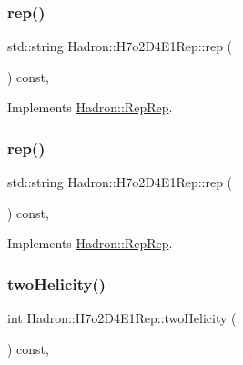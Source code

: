 \subsubsection{\texorpdfstring{rep()}{rep()}\hspace{0.1cm}{\footnotesize\ttfamily [4/5]}}
{\footnotesize\ttfamily std\+::string Hadron\+::\+H7o2\+D4\+E1\+Rep\+::rep (\begin{DoxyParamCaption}{ }\end{DoxyParamCaption}) const\hspace{0.3cm}{\ttfamily [inline]}, {\ttfamily [virtual]}}



Implements \mbox{\hyperlink{structHadron_1_1RepRep_ab3213025f6de249f7095892109575fde}{Hadron\+::\+Rep\+Rep}}.

\mbox{\label{structHadron_1_1H7o2D4E1Rep_ae6cc5dc38275bfce35b58694bc85cfe1}} 
\subsubsection{\texorpdfstring{rep()}{rep()}\hspace{0.1cm}{\footnotesize\ttfamily [5/5]}}
{\footnotesize\ttfamily std\+::string Hadron\+::\+H7o2\+D4\+E1\+Rep\+::rep (\begin{DoxyParamCaption}{ }\end{DoxyParamCaption}) const\hspace{0.3cm}{\ttfamily [inline]}, {\ttfamily [virtual]}}



Implements \mbox{\hyperlink{structHadron_1_1RepRep_ab3213025f6de249f7095892109575fde}{Hadron\+::\+Rep\+Rep}}.

\mbox{\label{structHadron_1_1H7o2D4E1Rep_a66f98547f6f9ab434d2b836bc46deddc}} 
\subsubsection{\texorpdfstring{twoHelicity()}{twoHelicity()}\hspace{0.1cm}{\footnotesize\ttfamily [1/3]}}
{\footnotesize\ttfamily int Hadron\+::\+H7o2\+D4\+E1\+Rep\+::two\+Helicity (\begin{DoxyParamCaption}{ }\end{DoxyParamCaption}) const\hspace{0.3cm}{\ttfamily [inline]}, {\ttfamily [virtual]}}

